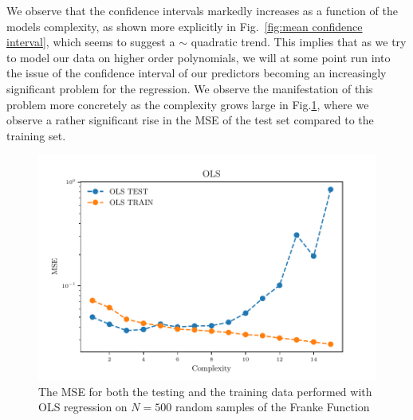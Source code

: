 \documentclass[reprint, english, nofootinbib]{revtex4-2}
\begin{document}
We observe that the confidence intervals markedly increases as a function of the models complexity, as shown more explicitly in Fig.~\ref{fig:mean confidence interval}, which seems to suggest a $\sim$ quadratic trend. This implies that as we try to model our data on higher order polynomials, we will at some point run into the issue of the confidence interval of our predictors becoming an increasingly significant problem for the regression.
We observe the manifestation of this problem more concretely as the complexity grows large in Fig.\ref{fig:Hastie2.11 MSE Bootstrap}, where we observe a rather significant rise in the MSE of the test set compared to the training set.

\begin{figure}[h!tb]
    \center
    \includegraphics[width=\columnwidth]{../figs/OLS_MSE_Bootstrap_Hastie_211_N_500.pdf}
    \caption{\label{fig:Hastie2.11 MSE Bootstrap}The MSE for both the testing and the training data performed with OLS regression on $N=500$ random samples of the Franke Function}
\end{figure}
\end{document}
